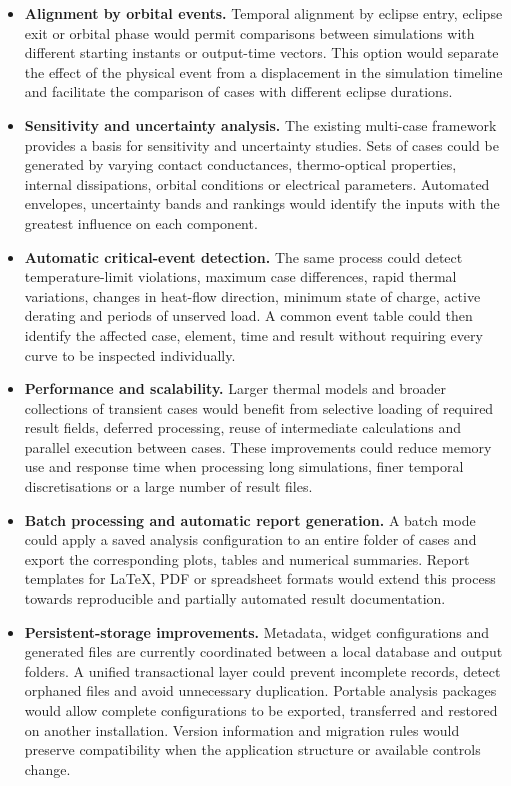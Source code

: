 \begin{itemize}[
    leftmargin=*,
    itemsep=0.9em,
    topsep=0.5em,
    parsep=0pt
]
    \item \textbf{Alignment by orbital events.}
    Temporal alignment by eclipse entry, eclipse exit or orbital phase would
    permit comparisons between simulations with different starting instants or
    output-time vectors. This option would separate the effect of the physical
    event from a displacement in the simulation timeline and facilitate the
    comparison of cases with different eclipse durations.

    \item \textbf{Sensitivity and uncertainty analysis.}
    The existing multi-case framework provides a basis for sensitivity and
    uncertainty studies. Sets of cases could be generated by varying contact
    conductances, thermo-optical properties, internal dissipations, orbital
    conditions or electrical parameters. Automated envelopes, uncertainty
    bands and rankings would identify the inputs with the greatest influence on
    each component.

    \item \textbf{Automatic critical-event detection.}
    The same process could detect temperature-limit violations, maximum case
    differences, rapid thermal variations, changes in heat-flow direction,
    minimum state of charge, active derating and periods of unserved load. A
    common event table could then identify the affected case, element, time and
    result without requiring every curve to be inspected individually.

    \item \textbf{Performance and scalability.}
    Larger thermal models and broader collections of transient cases would
    benefit from selective loading of required result fields, deferred
    processing, reuse of intermediate calculations and parallel execution
    between cases. These improvements could reduce memory use and response time
    when processing long simulations, finer temporal discretisations or a
    large number of result files.

    \item \textbf{Batch processing and automatic report generation.}
    A batch mode could apply a saved analysis configuration to an entire folder
    of cases and export the corresponding plots, tables and numerical
    summaries. Report templates for LaTeX, PDF or spreadsheet formats would
    extend this process towards reproducible and partially automated result
    documentation.

    \item \textbf{Persistent-storage improvements.}
    Metadata, widget configurations and generated files are currently
    coordinated between a local database and output folders. A unified
    transactional layer could prevent incomplete records, detect orphaned
    files and avoid unnecessary duplication. Portable analysis packages would
    allow complete configurations to be exported, transferred and restored on
    another installation. Version information and migration rules would
    preserve compatibility when the application structure or available
    controls change.


\end{itemize}
